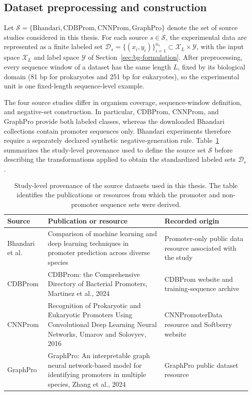 \subsection{Dataset preprocessing and construction}

Let $\mathcal{S}=\{\mathrm{Bhandari},\mathrm{CDBProm},\mathrm{CNNProm},\mathrm{GraphPro}\}$ denote the set of source studies considered in this thesis. For each source $s\in\mathcal{S}$, the experimental data are represented as a finite labeled set $\mathcal{D}_{s}=\{(x_i,y_i)\}_{i=1}^{n_s}\subset\mathcal{X}_L\times\mathcal{Y}$, with the input space $\mathcal{X}_L$ and label space $\mathcal{Y}$ of Section~\ref{sec:bg-formulation}. After preprocessing, every sequence window of a dataset has the same length $L$, fixed by its biological domain (81 bp for prokaryotes and 251 bp for eukaryotes), so the experimental unit is one fixed-length sequence-level example.

The four source studies differ in organism coverage, sequence-window definition,
and negative-set construction. In particular, CDBProm, CNNProm, and GraphPro
provide both labeled classes, whereas the downloaded Bhandari collections contain
promoter sequences only. Bhandari experiments therefore require a separately
declared synthetic negative-generation rule. Table~\ref{tab:active-source-provenance}
summarizes the study-level provenance used to define the source set $\mathcal{S}$
before describing the transformations applied to obtain the standardized labeled
sets $\mathcal{D}_{s}$.

\begin{table}[htbp]
\centering
\small
\caption{Study-level provenance of the source datasets used in this thesis. The table identifies the publications or resources from which the promoter and non-promoter sequence sets were derived.}
\label{tab:active-source-provenance}
\begin{tabular}{p{}p{}p{}}
\hline
Source & Publication or resource & Recorded origin \\
\hline
Bhandari et al. & Comparison of machine learning and deep learning techniques in promoter prediction across diverse species & Promoter-only public data resource associated with the study \\
CDBProm & CDBProm: the Comprehensive Directory of Bacterial Promoters, Martinez et al., 2024 & CDBProm website and training-sequence archive \\
CNNProm & Recognition of Prokaryotic and Eukaryotic Promoters Using Convolutional Deep Learning Neural Networks, Umarov and Solovyev, 2016 & CNNPromoterData resource and Softberry website \\
GraphPro & GraphPro: An interpretable graph neural network-based model for identifying promoters in multiple species, Zhang et al., 2024 & GraphPro public dataset resource \\
\hline
\end{tabular}
\end{table}

